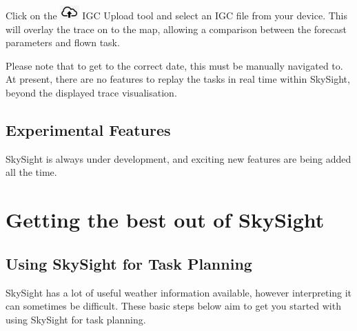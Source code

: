 \documentclass[11pt,a4paper]{article}
\begin{document}
Click on the \includegraphics[height=15pt]{images/icons/igc.png} IGC Upload tool and select an IGC file from your device. This will overlay the trace on to the map, allowing a comparison between the forecast parameters and flown task.

Please note that to get to the correct date, this must be manually navigated to. At present, there are no features to replay the tasks in real time within SkySight, beyond the displayed trace visualisation.

\subsection{Experimental Features}
SkySight is always under development, and exciting new features are being added all the time.
\section{Getting the best out of SkySight}
\subsection{Using SkySight for Task Planning} \label{subsec:taskplan}
SkySight has a lot of useful weather information available, however interpreting it can sometimes be difficult. These basic steps below aim to get you started with using SkySight for task planning.
\end{document}

